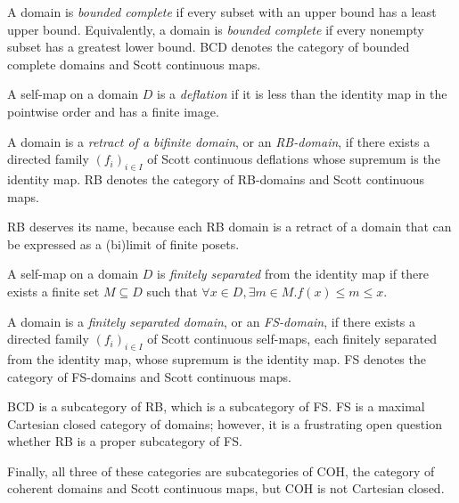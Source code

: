 \begin{definition}
A domain is \emph{bounded complete} if every subset with an upper bound has a least upper bound.  Equivalently, a domain is \emph{bounded complete} if every nonempty subset has a greatest lower bound.  \textsf{BCD} denotes the category of bounded complete domains and Scott continuous maps.
\end{definition}

\begin{definition}
A self-map on a domain $D$ is a \emph{deflation} if it is less than the identity map in the pointwise order and has a finite image.
\end{definition}

\begin{definition}
A domain is a \emph{retract of a bifinite domain}, or an \emph{RB-domain}, if there exists a directed family $(f_i)_{i\in I}$ of Scott continuous deflations whose supremum is the identity map.  \textsf{RB} denotes the category of RB-domains and Scott continuous maps.
\end{definition}
\textsf{RB} deserves its name, because each \textsf{RB} domain is a retract of a domain that can be expressed as a (bi)limit of finite posets.

\begin{definition}
A self-map on a domain $D$ is \emph{finitely separated} from the identity map if there exists a finite set $M\subseteq D$ such that
$\forall x\in D, \exists m\in M . f(x)\leq m \leq x$.
\end{definition}

\begin{definition}
A domain is a \emph{finitely separated domain}, or an \emph{FS-domain}, if there exists a directed family $(f_i)_{i\in I}$ of Scott continuous self-maps, each finitely separated from the identity map, whose supremum is the identity map.  \textsf{FS} denotes the category of FS-domains and Scott continuous maps.
\end{definition}

\textsf{BCD} is a subcategory of \textsf{RB}, which is a subcategory of \textsf{FS}.  \textsf{FS} is a maximal Cartesian closed category of domains; however, it is a frustrating open question whether \textsf{RB} is a proper subcategory of \textsf{FS}.

Finally, all three of these categories are subcategories of \textsf{COH}, the category of coherent domains and Scott continuous maps, but \textsf{COH} is not Cartesian closed.

